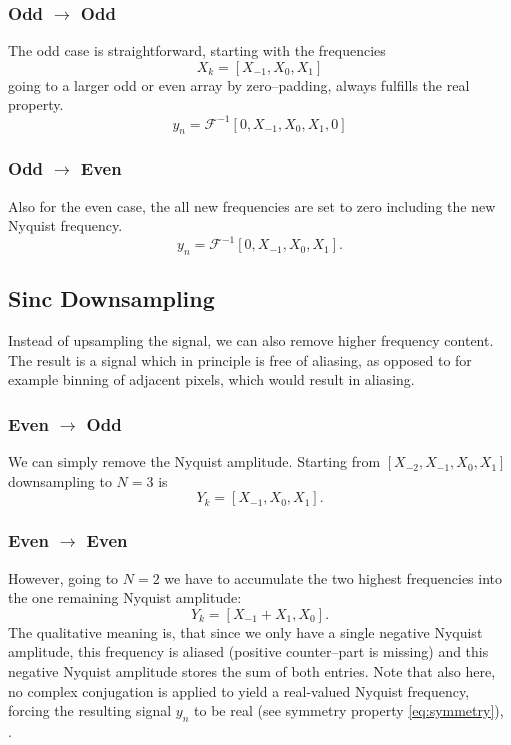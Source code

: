 \documentclass{juliacon}
\begin{document}
        \subsubsection{Odd $\rightarrow$ Odd}
            The odd case is straightforward, starting with the frequencies
            \begin{equation}
                X_k = [X_{-1}, X_0, X_1]
            \end{equation}
            going to a larger odd or even array by zero--padding, always fulfills the real property.
            \begin{equation}
                y_n = \mathcal{F}^{-1}[0, X_{-1}, X_0, X_1, 0]
            \end{equation}
            
        \subsubsection{Odd $\rightarrow$ Even}
            Also for the even case, the all new frequencies are set to zero including the new Nyquist frequency.
            \begin{equation}
                y_n = \mathcal{F}^{-1}\left[0, X_{-1}, X_0, X_1\right].
            \end{equation}
    
    
    \subsection{Sinc Downsampling}
        Instead of upsampling the signal, we can also remove higher frequency content.
        The result is a signal which in principle is free of aliasing, as opposed to for example binning of adjacent pixels, which would result in aliasing.
        
        \subsubsection{Even $\rightarrow$ Odd}
            We can simply remove the Nyquist amplitude.
            Starting from $[X_{-2}, X_{-1}, X_0, X_1]$ downsampling to $N=3$ is 
            \begin{equation}
                Y_k = [X_{-1}, X_0, X_1].
            \end{equation}
        \subsubsection{Even $\rightarrow$ Even}
            However, going to $N=2$ we have to accumulate the two highest frequencies into the one remaining Nyquist amplitude: 
            \begin{equation}
                Y_k = [X_{-1} + X_{1}, X_0].
            \end{equation}
            The qualitative meaning is, that since we only have a single negative Nyquist amplitude, this frequency is aliased (positive counter--part is missing) and this negative Nyquist amplitude stores the sum of both entries. Note that also here, no complex conjugation is applied to yield a real-valued Nyquist frequency, forcing the resulting signal $y_n$ to be real (see symmetry property \autoref{eq:symmetry}), .
            
\end{document}
